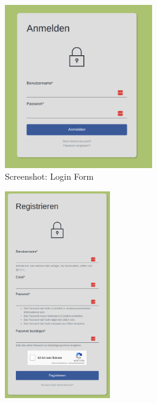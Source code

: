 \begin{figure}[htp]
    \begin{subfigure}[b]{0.32\textwidth}
        \centering
        \includegraphics[width=0.7\textwidth]{images/Auth1.png}
        \caption{Screenshot: Login Form}
        \label{fig:r-login}
    \end{subfigure}
    \begin{subfigure}[b]{0.32\textwidth}
        \centering
        \includegraphics[width=0.5\textwidth]{images/Auth2.png}

\end{subfigure}
\end{figure}
